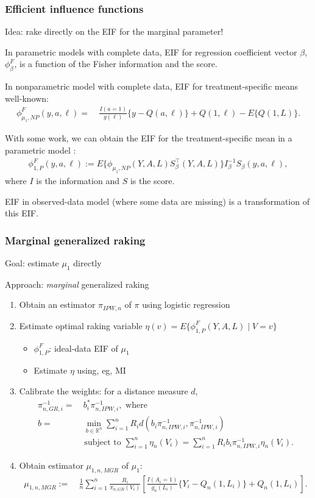 \documentclass[10pt, table]{beamer}
\begin{document}
\begin{frame} \frametitle{Efficient influence functions}
  Idea: rake directly on the EIF for the marginal parameter!

  In parametric models with complete data, EIF for regression coefficient vector $\beta$, $\phi_\beta^F$, is a function of the Fisher information and the score. \pause

  In nonparametric model with complete data, EIF for treatment-specific means well-known:
  \begin{align*}
    \phi_{\mu_1,NP}^F(y,a,\ell) =& \ \frac{I(a = 1)}{g(\ell)}\{y - Q(a,\ell)\} + Q(1,\ell) - E\{Q(1,L)\}.
  \end{align*} \pause

  With some work, we can obtain the EIF for the treatment-specific mean in a parametric model \citep{tsiatis2006semiparametric}:
  \begin{align*}
    \phi_{1,P}^F(y,a,\ell) := E\{\phi_{\mu_1,NP}(Y,A,L)S^\top_\beta(Y,A,L)\}I_\beta^{-1}S_\beta(y,a,\ell),
  \end{align*} 
  where $I$ is the information and $S$ is the score. 

  EIF in observed-data model (where some data are missing) is a transformation of this EIF.
\end{frame}

\begin{frame} \frametitle{Marginal generalized raking}
  Goal: estimate $\mu_1$ directly

  Approach: \textit{marginal} generalized raking \vspace{-0.2cm}
  \begin{enumerate}[<+->]
    \item Obtain an estimator $\pi_{IPW,n}$ of $\pi$ using logistic regression
    \item Estimate optimal raking variable $\eta(v) = E\{\phi_{1,P}^F(Y,A,L) \mid V = v\}$
    \begin{itemize}
      \item $\phi_{1,P}^F$: ideal-data EIF of $\mu_1$
      \item Estimate $\eta$ using, eg, MI
    \end{itemize}
    \item Calibrate the weights: for a distance measure $d$, 
    \begin{align*}
      \pi_{n,GR,i}^{-1} =& \ b_i^*\pi_{n,IPW,i}^{-1}, \text{ where } \\
    b =& \ \min_{b \in \mathbb{R}^n}\sum_{i=1}^n R_i d(b_i\pi_{n,IPW,i}^{-1},\pi_{n,IPW,i}^{-1}) \\
    & \text{ subject to }  \sum_{i=1}^n \eta_{n}(V_i) = \sum_{i=1}^n R_i b_i \pi_{n,IPW,i}^{-1} \eta_{n}(V_i).
    \end{align*}
    \item Obtain estimator $\mu_{1,n,MGR}$ of $\mu_1$:
    \begin{align*}
    \mu_{1,n,MGR} :=& \ \frac{1}{n}\sum_{i=1}^n \frac{R_i}{\pi_{n,GR}(V_i)}\left[\frac{I(A_i = 1)}{g_n(L_i)}\{Y_i - Q_n(1,L_i)\} + Q_n(1,L_i)\right].
\end{align*}
  \end{enumerate}
\end{frame}
\end{document}
